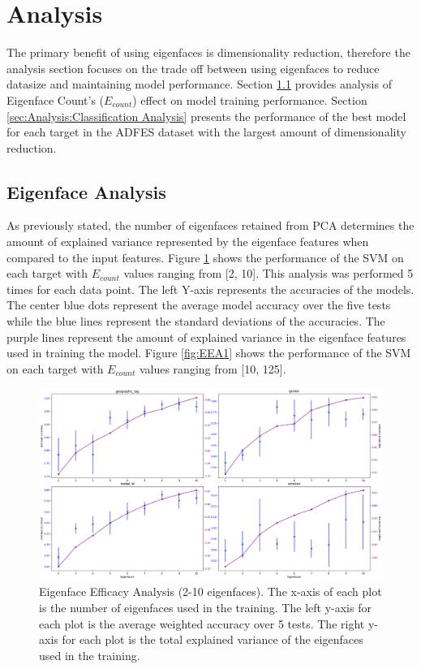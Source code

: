 \documentclass[journal]{new-aiaa}
\begin{document}
\section{Analysis}\label{sec:Analysis}
The primary benefit of using eigenfaces is dimensionality reduction, therefore the analysis section focuses on the trade off between using eigenfaces to reduce datasize and maintaining model performance.
Section \ref{sec:Analysis:Eigenface Analysis} provides analysis of Eigenface Count's ($E_{count}$) effect on model training performance.
Section \ref{sec:Analysis:Classification Analysis} presents the performance of the best model for each target in the ADFES dataset with the largest amount of dimensionality reduction.

\subsection{Eigenface Analysis}\label{sec:Analysis:Eigenface Analysis}
As previously stated, the number of eigenfaces retained from PCA determines the amount of explained variance represented by the eigenface features when compared to the input features.
Figure \ref{fig:EEA0} shows the performance of the SVM on each target with $E_{count}$ values ranging from [2, 10].
This analysis was performed 5 times for each data point.
The left Y-axis represents the accuracies of the models.
The center blue dots represent the average model accuracy over the five tests while the blue lines represent the standard deviations of the accuracies.
The purple lines represent the amount of explained variance in the eigenface features used in training the model.
Figure \ref{fig:EEA1} shows the performance of the SVM on each target with $E_{count}$ values ranging from [10, 125].

\begin{figure}[H]
  \centering
  \includegraphics[width=.9\textwidth]{figures/eigenface_analysis_2_10.png}
  \caption{Eigenface Efficacy Analysis (2-10 eigenfaces). The x-axis of each plot is the number of eigenfaces used in the training. The left y-axis for each plot is the average weighted accuracy over 5 tests. The right y-axis for each plot is the total explained variance of the eigenfaces used in the training.}
  \label{fig:EEA0}
\end{figure}
\end{document}
